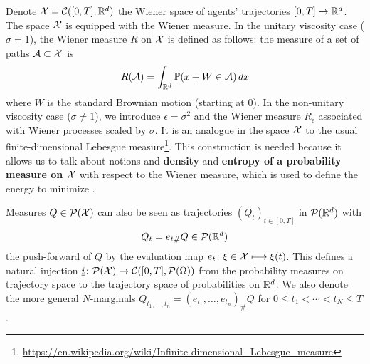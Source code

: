 \documentclass[../report.tex]{subfiles}
\begin{document}
Denote $\mathcal{X} = \mathcal{C}([0,T], \mathbb{R}^d)$ the Wiener space of agents' trajectories $[0,T] \to\mathbb{R}^d$. The space $\mathcal{X}$ is equipped with the Wiener measure.
In the unitary viscosity case ($\sigma = 1$), the Wiener measure $R$ on $\mathcal{X}$ is defined as follows: the measure of a set of paths $\mathcal{A} \subset \mathcal{X}$ is
\[
	R(\mathcal{A}) = \int_{\mathbb{R}^d}\mathbb{P}(x+W \in \mathcal{A})\, dx
\]
where $W$ is the standard Brownian motion (starting at $0$).
In the non-unitary viscosity case ($\sigma \neq 1$), we introduce $\epsilon = \sigma^2$ and the Wiener measure $R_\epsilon$ associated with Wiener processes scaled by $\sigma$.
It is an analogue in the space $\mathcal{X}$ to the usual finite-dimensional Lebesgue measure\footnote{\url{https://en.wikipedia.org/wiki/Infinite-dimensional_Lebesgue_measure}}. This construction is needed because it allows us to talk about notions and \textbf{density} and \textbf{entropy of a probability measure on $\mathcal{X}$} with respect to the Wiener measure, which is used to define the energy to minimize \cites{benamou:hal-01295299,benamou2015lagrangian}.


Measures $Q \in \mathcal{P}(\mathcal{X})$ can also be seen as trajectories $(Q_t)_{t\in[0,T]}$ in $\mathcal{P}(\mathbb{R}^d)$ with
\[
Q_t = e_{t\#}Q \in \mathcal{P}(\mathbb{R}^d)
\]
the push-forward of $Q$ by the evaluation map $e_t\colon \xi \in\mathcal{X}\longmapsto \xi(t)$. This defines a natural injection $\underline{i} \colon \mathcal{P}(\mathcal{X}) \rightarrow \mathcal{C}([0,T], \mathcal{P}(\Omega))$ from the probability measures on trajectory space to the trajectory space of probabilities on $\mathbb{R}^d$. We also denote the more general $N$-marginals $Q_{t_1,\ldots,t_n} = (e_{t_1},\ldots, e_{t_n})_\# Q$ for $0\leq t_1 < \cdots < t_N \leq T$.
\end{document}
